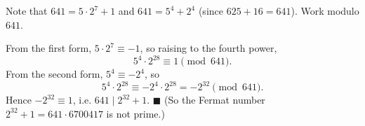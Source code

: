Note that $641=5\cdot2^7+1$ and $641=5^4+2^4$ (since $625+16=641$). Work modulo $641$.

From the first form, $5\cdot2^7\equiv-1$, so raising to the fourth power,
\[5^4\cdot2^{28}\equiv1\pmod{641}.\]
From the second form, $5^4\equiv-2^4$, so
\[5^4\cdot2^{28}\equiv-2^4\cdot2^{28}=-2^{32}\pmod{641}.\]
Hence $-2^{32}\equiv1$, i.e. $641\mid2^{32}+1$. $\blacksquare$ (So the Fermat number $2^{32}+1=641\cdot6700417$ is not prime.)
